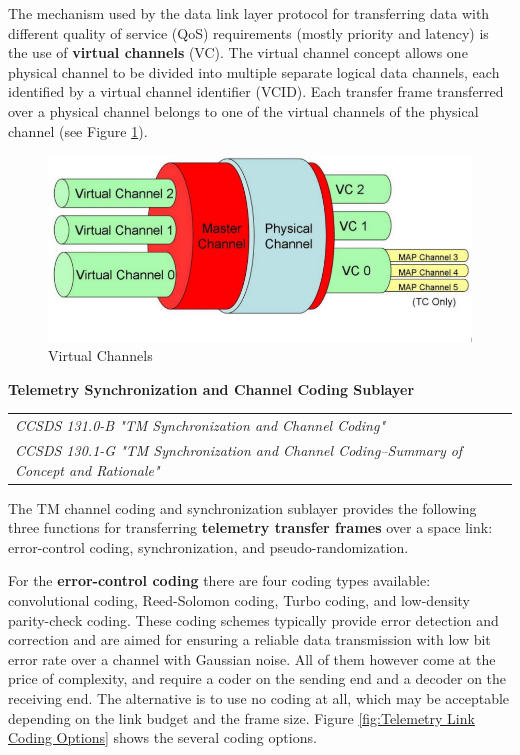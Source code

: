 The mechanism used by the data link layer protocol for transferring data with different quality of service (QoS) requirements (mostly priority and latency) is the use of \textbf{virtual channels} (VC). The virtual channel concept allows one physical channel to be divided into multiple separate logical data channels, each identified by a virtual channel identifier (VCID). Each transfer frame transferred over a physical channel belongs to one of the virtual channels of the physical channel (see Figure \ref{fig:Virtual Channels}).

\begin{figure}[h]
\centering\includegraphics[scale=0.4]{fig/virtual_channels}
\caption{Virtual Channels}
\label{fig:Virtual Channels}
\end{figure}

\textbf{Telemetry Synchronization and Channel Coding Sublayer}

\begin{tabular}{l}
\textit{CCSDS 131.0-B "TM Synchronization and Channel Coding" \cite{CCSDS 131.0-B}} \\
\textit{CCSDS 130.1-G "TM Synchronization and Channel Coding--Summary of Concept and Rationale" \cite{CCSDS 130.1-G}}
\end{tabular}

The TM channel coding and synchronization sublayer provides the following three functions for transferring \textbf{telemetry transfer frames} over a space link: error-control coding, synchronization, and pseudo-randomization. 

For the \textbf{error-control coding} there are four coding types available: convolutional coding, Reed-Solomon coding, Turbo coding, and low-density parity-check coding. These coding schemes typically provide error detection and correction and are aimed for ensuring a reliable data transmission with low bit error rate over a channel with Gaussian noise. All of them however come at the price of complexity, and require a coder on the sending end and a decoder on the receiving end. The alternative is to use no coding at all, which may be acceptable depending on the link budget and the frame size. Figure \ref{fig:Telemetry Link Coding Options} shows the several coding options.

